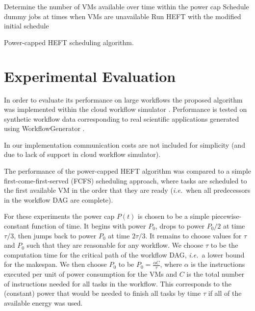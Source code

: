 \documentclass[10pt, conference, compsocconf]{IEEEtran} %
\newcommand{\ie}{\textit{i.e.}\ }
\begin{document}
\begin{algorithm}
  \begin{algorithmic}[1]
    \State Determine the number of VMs available over time within the power cap
    \State Schedule dummy jobs at times when VMs are unavailable
    \State Run HEFT with the modified initial schedule


  \end{algorithmic}
  \caption{Power-capped HEFT scheduling algorithm.}
  \label{alg:power-capped-heft}
\end{algorithm}

\section{Experimental Evaluation}

In order to evaluate its performance on large workflows the proposed algorithm was implemented within the cloud workflow simulator \cite{CloudWorkflowSimulator,malawski2012cost}.
Performance is tested on synthetic workflow data corresponding to real scientific applications generated using WorkflowGenerator \cite{WorkflowGenerator,Silva2014WorkflowGenerator}.

In our implementation communication costs are not included for simplicity (and due to lack of support in cloud workflow simulator).

The performance of the power-capped HEFT algorithm was compared to a simple first-come-first-served (FCFS) scheduling approach, where tasks are scheduled to the first available VM in the order that they are ready (\ie when all predecessors in the workflow DAG are complete).

For these experiments the power cap $P(t)$ is chosen to be a simple piecewise-constant function of time.
It begins with power $P_0$, drops to power $P_0/2$ at time $\tau/3$, then jumps back to power $P_0$ at time $2\tau/3$.
It remains to choose values for $\tau$ and $P_0$ such that they are reasonable for any workflow.
We choose $\tau$ to be the computation time for the critical path of the workflow DAG, \ie a lower bound for the makespan.
We then choose $P_0$ to be $P_0 = \frac{\alpha C}{\tau}$, where $\alpha$ is the instructions executed per unit of power consumption for the VMs and $C$ is the total number of instructions needed for all tasks in the workflow.
This corresponds to the (constant) power that would be needed to finish all tasks by time $\tau$ if all of the available energy was used.
\end{document}
